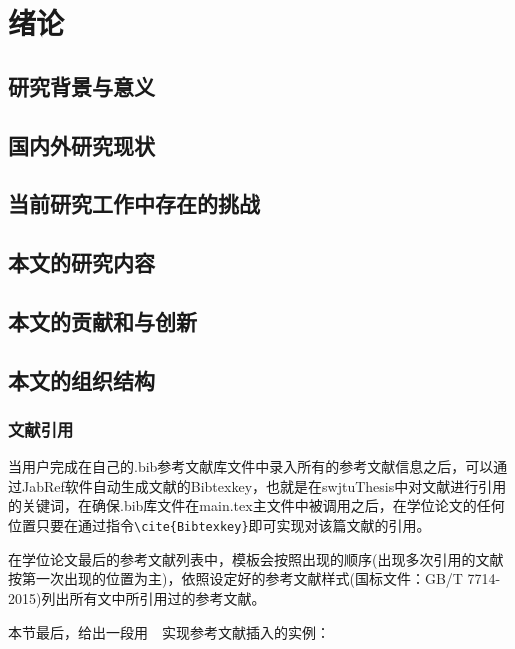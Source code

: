 
\chapter{绪论}

\section{研究背景与意义}
\section{国内外研究现状}
\section{当前研究工作中存在的挑战}
\section{本文的研究内容}
\section{本文的贡献和与创新}
\section{本文的组织结构}






\subsection{文献引用}
当用户完成在自己的.bib参考文献库文件中录入所有的参考文献信息之后，可以通过JabRef软件自动生成文献的Bibtexkey，也就是在swjtuThesis中对文献进行引用的关键词，在确保.bib库文件在main.tex主文件中被调用之后，在学位论文的任何位置只要在通过指令\verb|\cite{Bibtexkey}|即可实现对该篇文献的引用。

\par
在学位论文最后的参考文献列表中，模板会按照出现的顺序(出现多次引用的文献按第一次出现的位置为主)，依照设定好的参考文献样式(国标文件：GB/T 7714-2015)列出所有文中所引用过的参考文献。

\par
本节最后，给出一段用~\BibTeX{}~实现参考文献插入的实例：

